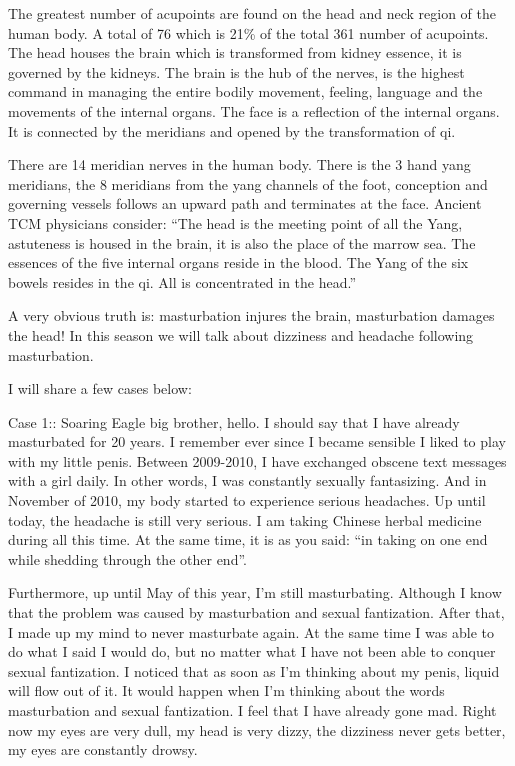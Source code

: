 \documentclass[
]{book}
\begin{document}
The greatest number of acupoints are found on the head and neck region of the human body. A total of 76 which is 21\% of the total 361 number of acupoints. The head houses the brain which is transformed from kidney essence, it is governed by the kidneys. The brain is the hub of the nerves, is the highest command in managing the entire bodily movement, feeling, language and the movements of the internal organs. The face is a reflection of the internal organs. It is connected by the meridians and opened by the transformation of qi.

There are 14 meridian nerves in the human body. There is the 3 hand yang meridians, the 8 meridians from the yang channels of the foot, conception and governing vessels follows an upward path and terminates at the face. Ancient TCM physicians consider: ``The head is the meeting point of all the Yang, astuteness is housed in the brain, it is also the place of the marrow sea. The essences of the five internal organs reside in the blood. The Yang of the six bowels resides in the qi. All is concentrated in the head.''

A very obvious truth is: masturbation injures the brain, masturbation damages the head! In this season we will talk about dizziness and headache following masturbation.

I will share a few cases below:

Case 1:: Soaring Eagle big brother, hello. I should say that I have already masturbated for 20 years. I remember ever since I became sensible I liked to play with my little penis. Between 2009-2010, I have exchanged obscene text messages with a girl daily. In other words, I was constantly sexually fantasizing. And in November of 2010, my body started to experience serious headaches. Up until today, the headache is still very serious. I am taking Chinese herbal medicine during all this time. At the same time, it is as you said: ``in taking on one end while shedding through the other end''.

Furthermore, up until May of this year, I'm still masturbating. Although I know that the problem was caused by masturbation and sexual fantization. After that, I made up my mind to never masturbate again. At the same time I was able to do what I said I would do, but no matter what I have not been able to conquer sexual fantization. I noticed that as soon as I'm thinking about my penis, liquid will flow out of it. It would happen when I'm thinking about the words masturbation and sexual fantization. I feel that I have already gone mad. Right now my eyes are very dull, my head is very dizzy, the dizziness never gets better, my eyes are constantly drowsy.
\end{document}
